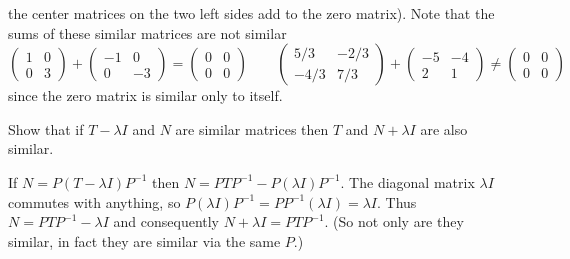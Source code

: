 \begin{exercises}
\begin{answer}
      the center matrices on the two left sides add to the zero matrix).
      Note that the sums of these similar matrices are not similar
      \begin{equation*}
         \begin{pmatrix}
            1  &0   \\
            0  &3
         \end{pmatrix}
         +
         \begin{pmatrix}
           -1  &0   \\
            0  &-3
         \end{pmatrix}
         =
         \begin{pmatrix}
           0  &0  \\
           0  &0
         \end{pmatrix}
         \qquad
         \begin{pmatrix}
            5/3  &-2/3   \\
            -4/3 &7/3
         \end{pmatrix}
         +
         \begin{pmatrix}
            -5  &-4   \\
             2  &1
         \end{pmatrix}
         \neq
         \begin{pmatrix}
           0  &0  \\
           0  &0
         \end{pmatrix}
      \end{equation*}
      since the zero matrix is similar only to itself.
    \end{answer}
  \item 
    Show that if \( T-\lambda I \) and \( N \) are similar matrices then
    \( T \) and \( N+\lambda I \) are also similar.
    \begin{answer}
    If \( N=P(T-\lambda I)P^{-1} \) then
    \( N=PTP^{-1}-P(\lambda I)P^{-1} \).
    The diagonal matrix \( \lambda I \) commutes with anything, so
    \( P(\lambda I)P^{-1}=PP^{-1}(\lambda I)=\lambda I \).
    Thus \( N=PTP^{-1}-\lambda I \) and
    consequently \( N+\lambda I=PTP^{-1} \).
    (So not only are they similar, in fact they are similar via 
    the same \( P \).)
    \end{answer}
\end{exercises}

















